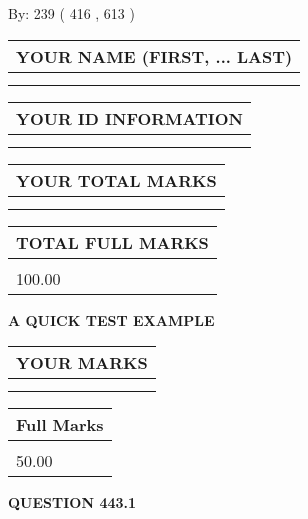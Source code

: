 \documentclass[12pt]{article}
\begin{document}
   
\hspace{1.0in} By: 
 239 ( 416 ,  613 )
   
   
   
   
\newpage 
\setcounter{page}{ 
   443001 } 
   
   
   
   
\noindent\begin{tabular}{|l|}
\hline
YOUR NAME (FIRST, ... LAST)  \\
\hline
 \\ 
 \\ 
\hline
\end{tabular}
\hspace{0.05in} \begin{tabular}{|l|}
\hline
 YOUR   ID   INFORMATION  \\
\hline
 \\ 
 \\ 
\hline
\end{tabular}
   
   
\vspace{0.2in}\noindent\begin{tabular}{|l|}
\hline
YOUR TOTAL MARKS  \\
\hline
 \\ 
 \\ 
\hline
\end{tabular}
\hspace{0.05in} \begin{tabular}{|l|}
\hline
TOTAL FULL MARKS  \\
\hline
 \\ 
100.00 \\
\hline
\end{tabular}
   
   
 \vspace{0.2in}
{\LARGE {\textbf{ A QUICK TEST EXAMPLE}}}
   
   
  
\vspace{0.2in}
  
\noindent\begin{tabular}{|l|}
\hline
 YOUR MARKS  \\
\hline
 \\ 
 \\ 
\hline
\end{tabular}
\hspace{0.05in} \begin{tabular}{|l|}
\hline
 Full Marks  \\
\hline
 \\ 
50.00 \\
\hline
\end{tabular}
{\textbf{\Large{QUESTION
443.1 
}}}
  
\end{document}
